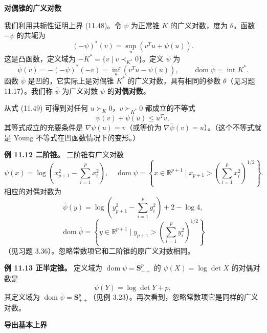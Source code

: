 \documentclass[UTF8,12pt,a4paper,fontset=fandol]{ctexart}
\begin{document}
\noindent\textbf{对偶锥的广义对数}

我们利用共轭性证明上界 (11.48)。令 $\psi$ 为正常锥 $K$ 的广义对数，度为 $\theta$。函数 $-\psi$ 的共轭为
\[
(-\psi)^\ast(v)=\sup_u(v^Tu+\psi(u)).
\]
这是凸函数，定义域为 $-K^\ast=\{v\mid v\prec_{K^\ast}0\}$。定义 $\overline{\psi}$ 为
\begin{equation}
\overline{\psi}(v)=-(-\psi)^\ast(-v)=\inf_u(v^Tu-\psi(u)),\qquad
\operatorname{dom}\overline{\psi}=\operatorname{int}K^\ast.
\tag{11.49}
\end{equation}
函数 $\overline{\psi}$ 是凹的，它实际上是对偶锥 $K^\ast$ 的广义对数，具有相同的参数 $\theta$（见习题 11.17）。我们称 $\overline{\psi}$ 为广义对数 $\psi$ 的\textbf{对偶对数}。

从式 (11.49) 可得到对任何 $u\succ_K0$，$v\succ_{K^\ast}0$ 都成立的不等式
\begin{equation}
\overline{\psi}(v)+\psi(u)\leq u^Tv,
\tag{11.50}
\end{equation}
其等式成立的充要条件是 $\nabla\psi(u)=v$（或等价为 $\nabla\overline{\psi}(v)=u$）。（这个不等式就是 Young 不等式在凹函数情况下的变形。）

\noindent\textbf{例 11.12 二阶锥。} 二阶锥有广义对数
\[
\psi(x)=\log\left(x_{p+1}^2-\sum_{i=1}^p x_i^2\right),\quad
\operatorname{dom}\psi=\left\{x\in\mathbb{R}^{p+1}\mid x_{p+1}>\left(\sum_{i=1}^p x_i^2\right)^{1/2}\right\}.
\]
相应的对偶对数为
\[
\overline{\psi}(y)=\log\left(y_{p+1}^2-\sum_{i=1}^p y_i^2\right)+2-\log4,
\]
\[
\operatorname{dom}\overline{\psi}=\left\{y\in\mathbb{R}^{p+1}\mid y_{p+1}>\left(\sum_{i=1}^p y_i^2\right)^{1/2}\right\}
\]
（见习题 3.36）。忽略常数项它和二阶锥的原广义对数相同。

\noindent\textbf{例 11.13 正半定锥。} 定义域为 $\operatorname{dom}\psi=\mathbf{S}_{++}^p$ 的 $\psi(X)=\log\det X$ 的对偶对数是
\[
\overline{\psi}(Y)=\log\det Y+p,
\]
其定义域为 $\operatorname{dom}\overline{\psi}=\mathbf{S}_{++}^p$（见例 3.23）。再次看到，忽略常数项它是同样的广义对数。

\noindent\textbf{导出基本上界}
\end{document}
